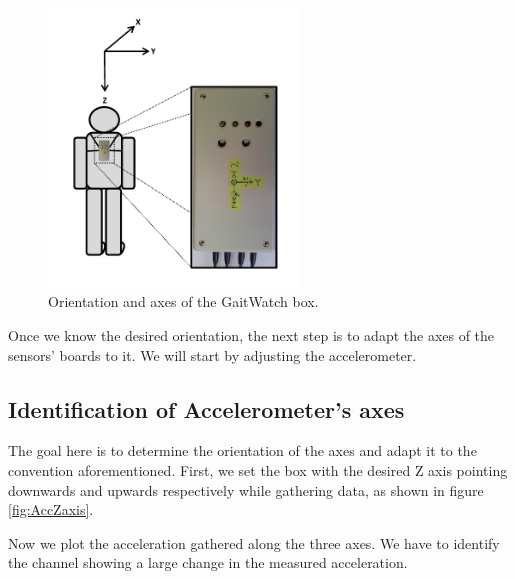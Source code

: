 \begin{figure}[H]
\centering
\includegraphics[width=0.6\textwidth]{figures/bodyAxesGW}
\caption{Orientation and axes of the GaitWatch box.}
\label{fig:gwBox}
\end{figure}

Once we know the desired orientation, the next step is to adapt the axes of the sensors' boards to it. We will start by adjusting the accelerometer. 

\subsection{Identification of Accelerometer's axes}
\label{subsec:acc_ID}

\indent The goal here is to determine the orientation of the axes and adapt it to the convention aforementioned. First, we set the box with the desired Z axis pointing downwards and upwards respectively while gathering data, as shown in figure \ref{fig:AccZaxis}.

Now we plot the acceleration gathered along the three axes. We have to identify the channel showing a large change in the measured acceleration.

